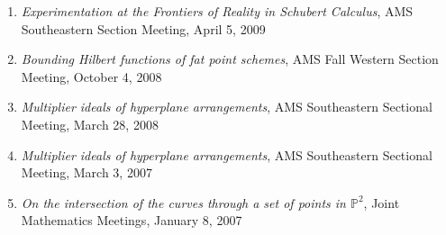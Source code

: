 \documentclass[12pt]{article}
\begin{document}
\begin{enumerate}[revarabic]
\item \textit{Experimentation at the Frontiers of Reality in Schubert Calculus},
AMS Southeastern Section Meeting, April 5, 2009

\item \textit{Bounding Hilbert functions of fat point schemes},
AMS Fall Western Section Meeting, October 4, 2008

\item \textit{Multiplier ideals of hyperplane arrangements},
AMS Southeastern Sectional Meeting, March 28, 2008

\item \textit{Multiplier ideals of hyperplane arrangements},
AMS Southeastern Sectional Meeting, March 3, 2007

\item \textit{On the intersection of the curves through a set of points in $\mathbb{P}^2$},
Joint Mathematics Meetings, January 8, 2007




\end{enumerate}


\end{document}
